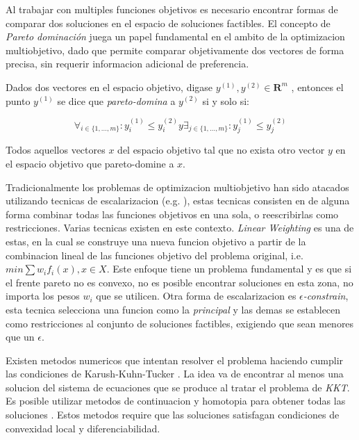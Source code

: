 Al trabajar con multiples funciones objetivos es necesario encontrar formas de comparar dos soluciones en el espacio de soluciones factibles. El concepto de \textit{Pareto dominaci\'on} juega un papel fundamental en el ambito de la optimizacion multiobjetivo, dado que permite comparar objetivamente dos vectores de forma precisa, sin requerir informacion adicional de preferencia.

\begin{definition}
\label{definition:pareto-dominance}

    Dados dos vectores en el espacio objetivo, digase $y^{(1)}, y^{(2)} \in \mathbf{R}^m$ , entonces el punto $y^{(1)}$ se dice que \emph{pareto-domina} a $y^{(2)}$ si y solo si:

    \begin{equation}
        \forall_{i\in\{1,\dots,m\}}: y_i^{(1)} \leq y_i^{(2)} y \exists_{j\in\{1,\dots,m\}}: y_j^{(1)} \le y_j^{(2)}
    \end{equation}
\end{definition}

\begin{definition}
\label{definition:pareto-front}
    Todos aquellos vectores $x$ del espacio objetivo tal que no exista otro vector $y$ en el espacio objetivo que pareto-domine a $x$.
\end{definition}

Tradicionalmente los problemas de optimizacion multiobjetivo han sido atacados utilizando tecnicas de escalarizacion (e.g. \parencite{miettinen2012nonlinear}), estas tecnicas consisten en de alguna forma combinar todas las funciones objetivos en una sola, o reescribirlas como restricciones. Varias tecnicas existen en este contexto. \textit{Linear Weighting} es una de estas, en la cual se construye una nueva funcion objetivo a partir de la combinacion lineal de las funciones objetivo del problema original, i.e. $min \sum w_i f_i(x), x \in X$. Este enfoque tiene un problema fundamental y es que si el frente pareto no es convexo, no es posible encontrar soluciones en esta zona, no importa los pesos $w_i$ que se utilicen. Otra forma de escalarizacion es \textit{$\epsilon$-constrain}, esta tecnica selecciona una funcion como la \textit{principal} y las demas se establecen como restricciones al conjunto de soluciones factibles, exigiendo que sean menores que un $\epsilon$.

Existen metodos numericos que intentan resolver el problema haciendo cumplir las condiciones de Karush-Kuhn-Tucker \parencite{kuhn2014nonlinear}. La idea va de encontrar al menos una solucion del sistema de ecuaciones que se produce al tratar el problema de \textit{KKT}. Es posible utilizar metodos de continuacion y homotopia para obtener todas las soluciones \parencite{hillermeier2001nonlinear, schutze2005continuation}. Estos metodos require que las soluciones satisfagan condiciones de convexidad local y diferenciabilidad.

